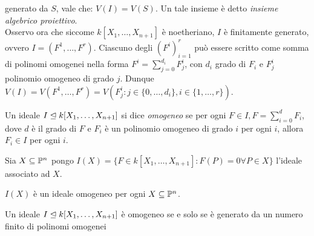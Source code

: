             generato da $S$, vale che: $V(I) = V(S)$. Un tale insieme è detto \emph{insieme algebrico proiettivo}.\\
            Osservo ora che siccome $k[X_1,\ldots,X_{n+1}]$ è noetheriano, $I$ è finitamente generato, ovvero $I = (F^1,\ldots,F^r)$. Ciascuno degli $(F^i)_{i=1}^r$ 
            può essere scritto come somma di polinomi omogenei nella forma $F^i = \sum_{j=0}^{d_i}F_j^i$, con $d_i$ grado di $F_i$ e $F_j^i$ polinomio omogeneo 
            di grado $j$. Dunque $V(I) = V(F^1,\ldots,F^r) = V(F_j^i : j \in \{0,\ldots,d_i\}, i \in \{1,\ldots,r\})$.
            \begin{definizione}
                Un ideale $I \ideal k[X_1,\ldots,X_{n+1}]$ si dice \emph{omogeneo} se per ogni $F \in I, F = \sum_{i=0}^d F_i$, dove $d$ è il grado di $F$ e 
                $F_i$ è un polinomio omogeneo di grado $i$ per ogni $i$, allora $F_i \in I$ per ogni $i$.
            \end{definizione}
            \begin{definizione}
                Sia $X \subseteq \P^n$ pongo $I(X) = \{F \in k[X_1,\ldots,X_{n+1}] : F(P)=0 \forall P \in X\}$ l'ideale associato ad $X$.
            \end{definizione} 
            \begin{osservazione}
                $I(X)$ è un ideale omogeneo per ogni $X \subseteq \P^n$.
            \end{osservazione}
            \begin{proposizione}
                Un ideale $I \ideal k[X_1,\ldots,X_{n+1}]$ è omogeneo se e solo se è generato da un numero finito di polinomi omogenei
            \end{proposizione}
